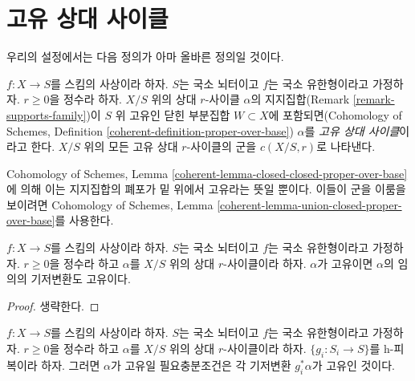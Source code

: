 \section{고유 상대 사이클}
\label{section-proper}

\noindent
우리의 설정에서는 다음 정의가 아마 올바른 정의일 것이다.

\begin{definition}
\label{definition-proper}
$f : X \to S$를 스킴의 사상이라 하자. $S$는 국소 뇌터이고 $f$는
국소 유한형이라고 가정하자. $r \geq 0$을 정수라 하자. $X/S$ 위의
상대 $r$-사이클 $\alpha$의 지지집합(Remark
\ref{remark-supports-family})이 $S$ 위 고유인 닫힌 부분집합
$W \subset X$에 포함되면(Cohomology of Schemes, Definition
\ref{coherent-definition-proper-over-base}) $\alpha$를 {\it 고유 상대
사이클}이라고 한다. $X/S$ 위의 모든 고유 상대 $r$-사이클의 군을
$c(X/S, r)$로 나타낸다.
\end{definition}

\noindent
Cohomology of Schemes, Lemma
\ref{coherent-lemma-closed-closed-proper-over-base}에 의해 이는
지지집합의 폐포가 밑 위에서 고유라는 뜻일 뿐이다. 이들이 군을
이룸을 보이려면 Cohomology of Schemes, Lemma
\ref{coherent-lemma-union-closed-proper-over-base}를 사용한다.

\begin{lemma}
\label{lemma-proper-functoriality}
$f : X \to S$를 스킴의 사상이라 하자. $S$는 국소 뇌터이고 $f$는
국소 유한형이라고 가정하자. $r \geq 0$을 정수라 하고 $\alpha$를
$X/S$ 위의 상대 $r$-사이클이라 하자. $\alpha$가 고유이면
$\alpha$의 임의의 기저변환도 고유이다.
\end{lemma}

\begin{proof}
생략한다.
\end{proof}

\begin{lemma}
\label{lemma-proper-h-descent}
$f : X \to S$를 스킴의 사상이라 하자. $S$는 국소 뇌터이고 $f$는
국소 유한형이라고 가정하자. $r \geq 0$을 정수라 하고 $\alpha$를
$X/S$ 위의 상대 $r$-사이클이라 하자. $\{g_i : S_i \to S\}$를
h-피복이라 하자. 그러면 $\alpha$가 고유일 필요충분조건은 각
기저변환 $g_i^*\alpha$가 고유인 것이다.
\end{lemma}

